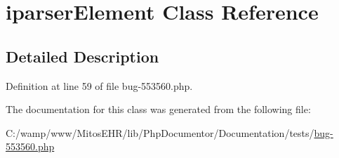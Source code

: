 \hypertarget{classiparser_element}{\section{iparser\-Element \-Class \-Reference}
\label{classiparser_element}
}


\subsection{\-Detailed \-Description}


\-Definition at line 59 of file bug-\/553560.\-php.



\-The documentation for this class was generated from the following file\-:\begin{DoxyCompactItemize}
\item 
\-C\-:/wamp/www/\-Mitos\-E\-H\-R/lib/\-Php\-Documentor/\-Documentation/tests/\hyperlink{bug-553560_8php}{bug-\/553560.\-php}\end{DoxyCompactItemize}
